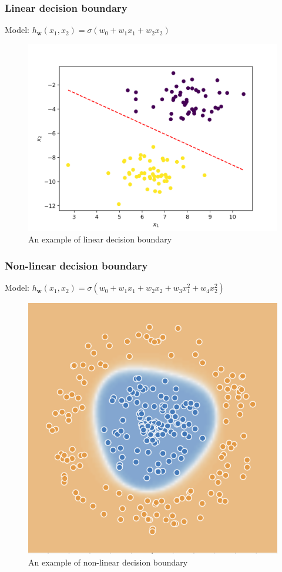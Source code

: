 \documentclass{beamer}
\begin{document}
	\begin{frame}
		\frametitle{Linear decision boundary}
		Model: $h_{\bm{w}}(x_1, x_2) = \sigma(w_0 + w_1 x_1 + w_2 x_2)$
		\begin{figure}
			\centering
			\includegraphics[scale=0.5]{images/linear_decision_boundary}
			\caption{An example of linear decision boundary}
		\end{figure}
	\end{frame}

	\begin{frame}
		\frametitle{Non-linear decision boundary}
		Model: $h_{\bm{w}}(x_1, x_2) = \sigma(w_0 + w_1 x_1 + w_2 x_2 + w_3 x_1^2 + w_4 x_2^2)$
		\begin{figure}
			\centering
			\includegraphics[scale=0.8]{images/non-linear-decision-boundary}
			\caption{An example of non-linear decision boundary}
		\end{figure}
	\end{frame}
\end{document}
